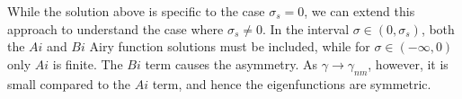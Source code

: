 \documentclass[linenumbers]{aastex63}
\begin{document}
While the solution above is specific to the case $\sigma_s = 0$, we can extend this approach to understand the case where $\sigma_s \neq 0$. In the interval $\sigma \in (0, \sigma_s)$, both the $Ai$ and $Bi$ Airy function solutions must be included, while for $\sigma \in (-\infty, 0)$ only $Ai$ is finite. The $Bi$ term causes the asymmetry. As $\gamma \rightarrow \gamma_{nm}$, however, it is small compared to the $Ai$ term, and hence the eigenfunctions are symmetric. 





{}

\end{document}
